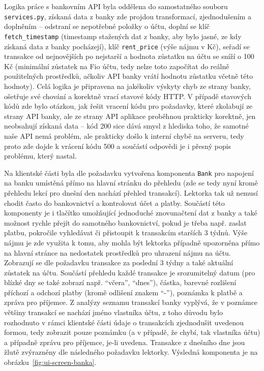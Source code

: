 Logika práce s bankovním API byla oddělena do samostatného souboru \verb|services.py|, získaná data z banky zde projdou transformací, zjednodušením a doplněním -- odstraní se nepotřebné položky o účtu, doplní se klíč \verb|fetch_timestamp| (timestamp stažených dat z banky, aby bylo jasné, ze kdy získaná data z banky pocházejí), klíč \verb|rent_price| (výše nájmu v Kč), seřadí se transakce od nejnovějších po nejstarší a hodnota zůstatku na účtu se sníží o 100 Kč (minimální zůstatek na Fio účtu, tedy nelze toto započítat do reálně použitelných prostředků, ačkoliv API banky vrátí hodnotu zůstatku včetně této hodnoty). Celá logika je připravena na jakékoliv výskyty chyb ze strany banky, ošetřuje své chování a korektně vrací stavové kódy HTTP. V případě stavových kódů zde bylo otázkou, jak řešit vracení kódu pro požadavky, které zkolabují ze strany API banky, ale ze strany API aplikace proběhnou prakticky korektně, jen neobsahují získaná data -- kód 200 sice dává smysl z hlediska toho, že samotné naše API nemá problém, ale prakticky došlo k interní chybě na serveru, tedy proto zde dojde k vrácení kódu 500 a součástí odpovědi je i přesný popis problému, který nastal.

Na klientské části byla dle požadavku vytvořena komponenta \verb|Bank| pro napojení na banku umístěná přímo na hlavní stránku do přehledu (zde se tedy nyní kromě přehledu lekcí pro dnešní den nachází přehled transakcí). Lektorka tak už nemusí chodit často do bankovnictví a kontrolovat účet a platby. Součástí této komponenty je i tlačítko umožňující jednoduché znovunačtení dat z banky a také možnost rychle přejít do samotného bankovnictví, pokud je třeba např. zaslat platbu, pokročile vyhledávat či přistoupit k transakcím starších 3 týdnů. Výše nájmu je zde využita k tomu, aby mohla být lektorka případně upozorněna přímo na hlavní stránce na nedostatek prostředků pro uhrazení nájmu na účtu. Zobrazují se dle požadavku transakce za poslední 3 týdny a také aktuální zůstatek na účtu. Součástí přehledu každé transakce je srozumitelný datum (pro blízké dny se také zobrazí např. \enquote{včera}, \enquote{dnes}), částka, barevné rozlišení příchozí a odchozí platby (kromě odlišení znakem \enquote{-}), poznámka k platbě a zpráva pro příjemce. Z analýzy seznamu transakcí banky vyplývá, že v poznámce většiny transakcí se nachází jméno vlastníka účtu, z toho důvodu bylo rozhodnuto v rámci klientské části údaje o transakcích zjednodušit uvedenou formou, tedy zobrazit pouze poznámku (a v případě, že chybí, tak vlastníka účtu) a případně zprávu pro příjemce, je-li uvedena. Transakce z dnešního dne jsou žlutě zvýrazněny dle následného požadavku lektorky. Výsledná komponenta je na obrázku~\ref{fig:ui-screen-banka}.

